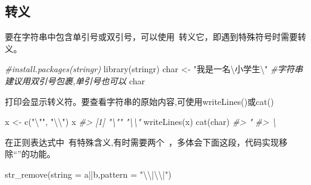 \documentclass[
]{book}
\newenvironment{Shaded}{\begin{snugshade}}{\end{snugshade}}
\newcommand{\AttributeTok}[1]{\textcolor[rgb]{0.77,0.63,0.00}{#1}}
\newcommand{\CommentTok}[1]{\textcolor[rgb]{0.56,0.35,0.01}{\textit{#1}}}
\newcommand{\FunctionTok}[1]{\textcolor[rgb]{0.00,0.00,0.00}{#1}}
\newcommand{\NormalTok}[1]{#1}
\newcommand{\OtherTok}[1]{\textcolor[rgb]{0.56,0.35,0.01}{#1}}
\newcommand{\SpecialCharTok}[1]{\textcolor[rgb]{0.00,0.00,0.00}{#1}}
\newcommand{\StringTok}[1]{\textcolor[rgb]{0.31,0.60,0.02}{#1}}
\begin{document}
\hypertarget{ux8f6cux4e49}{%
\subsection{转义}\label{ux8f6cux4e49}}

要在字符串中包含单引号或双引号，可以使用~转义它，即遇到特殊符号时需要转义。

\begin{Shaded}
\begin{Highlighting}[]
\CommentTok{\#install.packages(\textquotesingle{}stringr\textquotesingle{})}
\FunctionTok{library}\NormalTok{(stringr)}
\NormalTok{char }\OtherTok{\textless{}{-}} \StringTok{"我是一名}\SpecialCharTok{\textbackslash{}\textquotesingle{}}\StringTok{小学生}\SpecialCharTok{\textbackslash{}\textquotesingle{}}\StringTok{"}   \CommentTok{\#字符串建议用双引号包裹,单引号也可以}
\NormalTok{char}
\end{Highlighting}
\end{Shaded}

打印会显示转义符。要查看字符串的原始内容,可使用writeLines()或cat()

\begin{Shaded}
\begin{Highlighting}[]
\NormalTok{x }\OtherTok{\textless{}{-}} \FunctionTok{c}\NormalTok{(}\StringTok{"}\SpecialCharTok{\textbackslash{}"}\StringTok{"}\NormalTok{, }\StringTok{"}\SpecialCharTok{\textbackslash{}\textbackslash{}}\StringTok{"}\NormalTok{)}
\NormalTok{x}
\CommentTok{\#\textgreater{} [1] "\textbackslash{}"" "\textbackslash{}\textbackslash{}"}
\FunctionTok{writeLines}\NormalTok{(x)}
\FunctionTok{cat}\NormalTok{(char)}
\CommentTok{\#\textgreater{} "}
\CommentTok{\#\textgreater{} \textbackslash{}}
\end{Highlighting}
\end{Shaded}

在正则表达式中~有特殊含义,有时需要两个~，多体会下面这段，代码实现移除``\textbar\textbar{}''的功能。

\begin{Shaded}
\begin{Highlighting}[]
\FunctionTok{str\_remove}\NormalTok{(}\AttributeTok{string =} \StringTok{\textquotesingle{}a||b\textquotesingle{}}\NormalTok{,}\AttributeTok{pattern =} \StringTok{"}\SpecialCharTok{\textbackslash{}\textbackslash{}}\StringTok{|}\SpecialCharTok{\textbackslash{}\textbackslash{}}\StringTok{|"}\NormalTok{)}
\end{Highlighting}
\end{Shaded}
\end{document}
